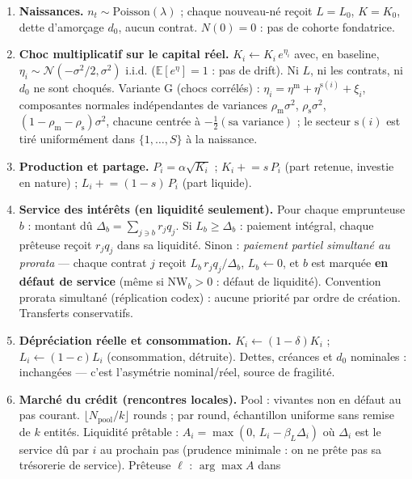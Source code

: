\documentclass[11pt,a4paper]{article}
\newcommand{\NW}{\mathrm{NW}}
\newcommand{\E}{\mathbb{E}}
\begin{document}
\begin{enumerate}[leftmargin=1.8em, itemsep=3pt]
\item \textbf{Naissances.} $n_t \sim \mathrm{Poisson}(\lambda)$ ; chaque
  nouveau-né reçoit $L = L_0$, $K = K_0$, dette d'amorçage $d_0$, aucun
  contrat. $N(0) = 0$ : pas de cohorte fondatrice.
\item \textbf{Choc multiplicatif sur le capital réel.}
  $K_i \leftarrow K_i \, e^{\eta_i}$ avec, en baseline,
  $\eta_i \sim \mathcal{N}(-\sigma^2/2, \sigma^2)$ i.i.d.
  ($\E[e^{\eta}] = 1$ : pas de drift). Ni $L$, ni les contrats, ni $d_0$ ne
  sont choqués. Variante G (chocs corrélés) :
  $\eta_i = \eta^{\mathrm{m}} + \eta^{\mathrm{s}(i)} + \xi_i$, composantes
  normales indépendantes de variances $\rho_{\mathrm{m}}\sigma^2$,
  $\rho_{\mathrm{s}}\sigma^2$, $(1-\rho_{\mathrm{m}}-\rho_{\mathrm{s}})\sigma^2$,
  chacune centrée à $-\tfrac{1}{2}(\text{sa variance})$ ; le secteur
  $\mathrm{s}(i)$ est tiré uniformément dans $\{1,\dots,S\}$ à la naissance.
\item \textbf{Production et partage.} $P_i = \alpha\sqrt{K_i}$ ;
  $K_i \mathrel{+}= s\,P_i$ (part retenue, investie en nature) ;
  $L_i \mathrel{+}= (1-s)\,P_i$ (part liquide).
\item \textbf{Service des intérêts (en liquidité seulement).} Pour chaque
  emprunteuse $b$ : montant dû $\Delta_b = \sum_{j \ni b} r_j q_j$. Si
  $L_b \ge \Delta_b$ : paiement intégral, chaque prêteuse reçoit $r_j q_j$
  dans sa liquidité. Sinon : \emph{paiement partiel simultané au prorata} ---
  chaque contrat $j$ reçoit $L_b \, r_j q_j / \Delta_b$, $L_b \leftarrow 0$,
  et $b$ est marquée \textbf{en défaut de service} (même si $\NW_b > 0$ :
  défaut de liquidité). Convention prorata simultané (réplication codex) :
  aucune priorité par ordre de création. Transferts conservatifs.
\item \textbf{Dépréciation réelle et consommation.}
  $K_i \leftarrow (1-\delta) K_i$ ; $L_i \leftarrow (1-c) L_i$ (consommation,
  détruite). Dettes, créances et $d_0$ nominales : inchangées --- c'est
  l'asymétrie nominal/réel, source de fragilité.
\item \textbf{Marché du crédit (rencontres locales).} Pool : vivantes non en
  défaut au pas courant. $\lfloor N_{\mathrm{pool}}/k \rfloor$ rounds ; par
  round, échantillon uniforme sans remise de $k$ entités.
  Liquidité prêtable : $A_i = \max(0,\, L_i - \beta_L \Delta_i)$ où $\Delta_i$
  est le service dû par $i$ au prochain pas (prudence minimale : on ne prête
  pas sa trésorerie de service). Prêteuse $\ell$ : $\arg\max A$ dans

\end{enumerate}
\end{document}
